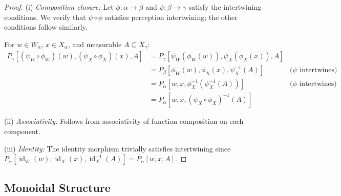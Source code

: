 \documentclass[11pt,a4paper]{article}
\theoremstyle{definition}
\theoremstyle{plain}
\theoremstyle{remark}
\DeclareMathOperator{\id}{id}
\begin{document}
\begin{proof}
(i) \textit{Composition closure:} Let $\phi: \alpha \to \beta$ and $\psi: \beta \to \gamma$ satisfy the intertwining conditions. We verify that $\psi \circ \phi$ satisfies perception intertwining; the other conditions follow similarly.

For $w \in W_\alpha$, $x \in X_\alpha$, and measurable $A \subseteq X_\gamma$:
\begin{align*}
P_\gamma[(\psi_W \circ \phi_W)(w), (\psi_X \circ \phi_X)(x), A]
&= P_\gamma[\psi_W(\phi_W(w)), \psi_X(\phi_X(x)), A] \\
&= P_\beta[\phi_W(w), \phi_X(x), \psi_X^{-1}(A)] & \text{($\psi$ intertwines)} \\
&= P_\alpha[w, x, \phi_X^{-1}(\psi_X^{-1}(A))] & \text{($\phi$ intertwines)} \\
&= P_\alpha[w, x, (\psi_X \circ \phi_X)^{-1}(A)]
\end{align*}

(ii) \textit{Associativity:} Follows from associativity of function composition on each component.

(iii) \textit{Identity:} The identity morphism trivially satisfies intertwining since $P_\alpha[\id_W(w), \id_X(x), \id_X^{-1}(A)] = P_\alpha[w, x, A]$.
\end{proof}

\subsection{Monoidal Structure}
\end{document}
